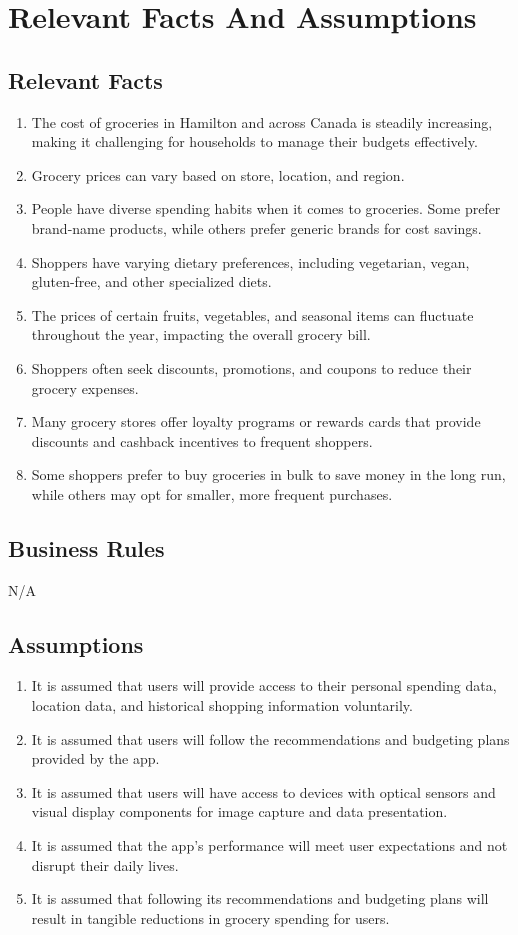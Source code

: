 \documentclass[12pt]{article}
\begin{document}
\section{Relevant Facts And Assumptions}
\subsection{Relevant Facts}
\begin{enumerate}
    \item The cost of groceries in Hamilton and across Canada is steadily increasing, making it challenging for households to manage their budgets effectively.
    \item Grocery prices can vary based on store, location, and region.
    \item People have diverse spending habits when it comes to groceries. Some prefer brand-name products, while others prefer generic brands for cost savings.
    \item Shoppers have varying dietary preferences, including vegetarian, vegan, gluten-free, and other specialized diets.
    \item The prices of certain fruits, vegetables, and seasonal items can fluctuate throughout the year, impacting the overall grocery bill.
    \item Shoppers often seek discounts, promotions, and coupons to reduce their grocery expenses.
    \item Many grocery stores offer loyalty programs or rewards cards that provide discounts and cashback incentives to frequent shoppers.
    \item Some shoppers prefer to buy groceries in bulk to save money in the long run, while others may opt for smaller, more frequent purchases.
\end{enumerate}
\subsection{Business Rules}
N/A
\subsection{Assumptions}
\begin{enumerate}
    \item It is assumed that users will provide access to their personal spending data, location data, and historical shopping information voluntarily.
    \item It is assumed that users will follow the recommendations and budgeting plans provided by the app.
    \item It is assumed that users will have access to devices with optical sensors and visual display components for image capture and data presentation.
    \item It is assumed that the app's performance will meet user expectations and not disrupt their daily lives.
    \item It is assumed that following its recommendations and budgeting plans will result in tangible reductions in grocery spending for users.
\end{enumerate}
\end{document}

